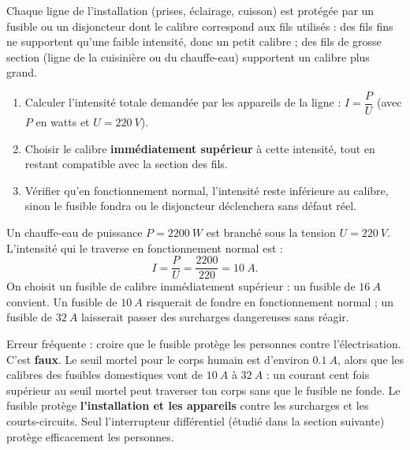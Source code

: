 \documentclass[11pt]{article}
\newcommand{\cle}[1]{{\popxbold\color{popdark}#1}}
\begin{document}
Chaque ligne de l'installation (prises, éclairage, cuisson) est protégée par un fusible ou un disjoncteur dont le calibre correspond aux fils utilisés : des fils fins ne supportent qu'une faible intensité, donc un petit calibre ; des fils de grosse section (ligne de la cuisinière ou du chauffe-eau) supportent un calibre plus grand.

\begin{methode}
\begin{enumerate}
\item Calculer l'intensité totale demandée par les appareils de la ligne : $I = \dfrac{P}{U}$ (avec $P$ en watts et $U = \SI{220}{V}$).
\item Choisir le calibre \textbf{immédiatement supérieur} à cette intensité, tout en restant compatible avec la section des fils.
\item Vérifier qu'en fonctionnement normal, l'intensité reste inférieure au calibre, sinon le fusible fondra ou le disjoncteur déclenchera sans défaut réel.
\end{enumerate}
\end{methode}

\begin{exemplebox}
Un chauffe-eau de puissance $P = \SI{2200}{W}$ est branché sous la tension $U = \SI{220}{V}$. L'intensité qui le traverse en fonctionnement normal est :
\[ I = \frac{P}{U} = \frac{2200}{220} = \SI{10}{A}. \]
On choisit un fusible de calibre immédiatement supérieur : un fusible de $\SI{16}{A}$ convient. Un fusible de $\SI{10}{A}$ risquerait de fondre en fonctionnement normal ; un fusible de $\SI{32}{A}$ laisserait passer des surcharges dangereuses sans réagir.
\end{exemplebox}

\begin{attention}
Erreur fréquente : croire que le fusible protège les personnes contre l'électrisation. C'est \textbf{faux}. Le seuil mortel pour le corps humain est d'environ $\SI{0,1}{A}$, alors que les calibres des fusibles domestiques vont de $\SI{10}{A}$ à $\SI{32}{A}$ : un courant cent fois supérieur au seuil mortel peut traverser ton corps sans que le fusible ne fonde. Le fusible protège \textbf{l'installation et les appareils} contre les surcharges et les courts-circuits. Seul l'\cle{interrupteur différentiel} (étudié dans la section suivante) protège efficacement les personnes.
\end{attention}
\end{document}
